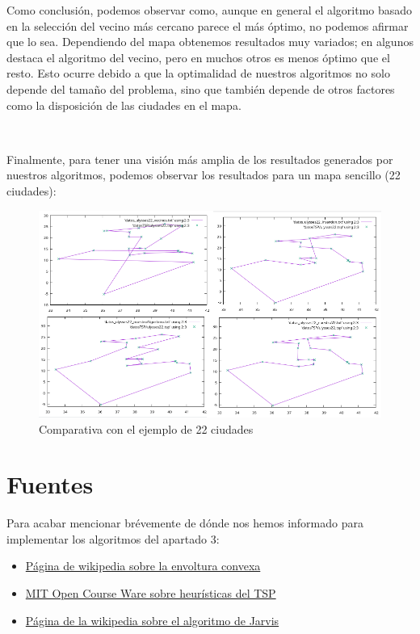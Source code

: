 \documentclass{article}
\begin{document}
Como conclusión, podemos observar como, aunque en general el algoritmo basado en la selección del vecino más cercano parece el más óptimo, no podemos afirmar que lo sea. Dependiendo del mapa obtenemos resultados muy variados; en algunos destaca el algoritmo del vecino, pero en muchos otros es menos óptimo que el resto. Esto ocurre debido a que la optimalidad de nuestros algoritmos no solo depende del tamaño del problema, sino que también depende de otros factores como la disposición de las ciudades en el mapa.

 \

Finalmente, para tener una visión más amplia de los resultados generados por nuestros algoritmos, podemos observar los resultados para un mapa sencillo (22 ciudades):

\begin{figure}[H]
	\centering
	\includegraphics[totalheight=8cm]{img/comparativa3}
	\caption{Comparativa con el ejemplo de 22 ciudades}
	\label{fig:comparativa3}
\end{figure}



\section{Fuentes}
Para acabar mencionar brévemente de dónde nos hemos informado para implementar los algoritmos del apartado 3:
\begin{itemize}
 \item \href{https://en.wikipedia.org/wiki/Convex_hull}{Página de wikipedia sobre la envoltura convexa}
 \item \href{https://ocw.mit.edu/courses/civil-and-environmental-engineering/1-203j-logistical-and-transportation-planning-methods-fall-2006/lecture-notes/lec16.pdf}{MIT Open Course Ware sobre heurísticas del TSP}
 \item \href{https://en.wikipedia.org/wiki/Gift_wrapping_algorithm}{Página de la wikipedia sobre el algoritmo de Jarvis}
\end{itemize}
\end{document}
